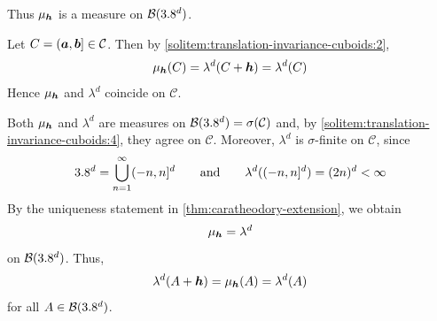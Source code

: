 \begin{solution}
\begin{enumerate}[label={\protect\hyperref[exitem:translation-invariance-cuboids:\arabic*]{(\alph*)}}]
Thus $\mu_{{\boldsymbol{h}}}$ is a measure on $\mathcal{B}(3.8^d)$.

\item \label{solitem:translation-invariance-cuboids:4}
Let $C=({\boldsymbol{a}},{\boldsymbol{b}}]\in\mathcal{C}$.
Then by \ref{solitem:translation-invariance-cuboids:2},
\[
\mu_{{\boldsymbol{h}}}(C)
=
\lambda^d(C+{\boldsymbol{h}})
=
\lambda^d(C)
\]
Hence $\mu_{{\boldsymbol{h}}}$ and $\lambda^d$ coincide on $\mathcal{C}$.

\item \label{solitem:translation-invariance-cuboids:5}
Both $\mu_{{\boldsymbol{h}}}$ and $\lambda^d$ are measures on $\mathcal{B}(3.8^d)=\sigma(\mathcal{C})$ and, by \ref{solitem:translation-invariance-cuboids:4}, they agree on $\mathcal{C}$.
Moreover, $\lambda^d$ is $\sigma$-finite on $\mathcal{C}$, since
\[
3.8^d
=
\bigcup_{n=1}^{\infty} (-n,n]^d
\qquad
\text{and}
\qquad
\lambda^d((-n,n]^d)=(2n)^d<\infty
\]
By the uniqueness statement in \autoref{thm:caratheodory-extension}, we obtain
\[
\mu_{{\boldsymbol{h}}}
=
\lambda^d
\]
on $\mathcal{B}(3.8^d)$.
Thus, 
\[
\lambda^d(A+{\boldsymbol{h}})
=
\mu_{{\boldsymbol{h}}}(A)
=
\lambda^d(A)
\]
for all $A\in\mathcal{B}(3.8^d)$.
\qedhere
\end{enumerate}
\end{solution}










